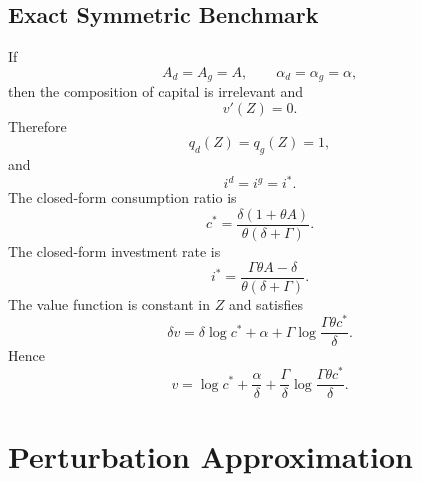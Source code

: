 \documentclass[11pt]{article}
\begin{document}
\subsection{Exact Symmetric Benchmark}

If
\begin{equation}
    A_d=A_g=A,
    \qquad
    \alpha_d=\alpha_g=\alpha,
\end{equation}
then the composition of capital is irrelevant and
\begin{equation}
    v'(Z)=0.
\end{equation}
Therefore
\begin{equation}
    q_d(Z)=q_g(Z)=1,
\end{equation}
and
\begin{equation}
    i^d=i^g=i^*.
\end{equation}
The closed-form consumption ratio is
\begin{equation}
    c^*
    =
    \frac{\delta(1+\theta A)}{\theta(\delta+\Gamma)}.
\end{equation}
The closed-form investment rate is
\begin{equation}
    i^*
    =
    \frac{\Gamma\theta A-\delta}{\theta(\delta+\Gamma)}.
\end{equation}
The value function is constant in $Z$ and satisfies
\begin{equation}
    \delta v
    =
    \delta\log c^*
    +\alpha
    +\Gamma\log\frac{\Gamma\theta c^*}{\delta}.
\end{equation}
Hence
\begin{equation}
    \boxed{
    v
    =
    \log c^*
    +\frac{\alpha}{\delta}
    +\frac{\Gamma}{\delta}\log\frac{\Gamma\theta c^*}{\delta}.
    }
\end{equation}

\section{Perturbation Approximation}
\end{document}
